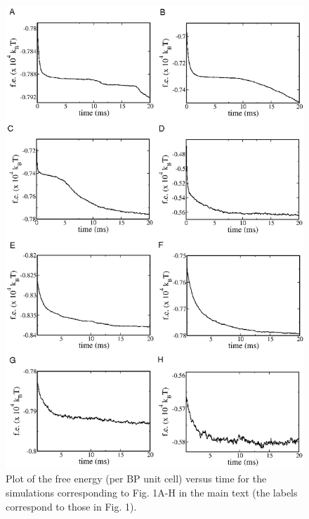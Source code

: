 \documentclass[12pt,twoside]{article}
\begin{document}
\begin{figure}[!h]
\begin{center}
\includegraphics[scale=0.49]{support-fig4.png}
\end{center}
\caption{Plot of the free energy (per BP unit cell) versus time
for the simulations corresponding to Fig. 1A-H in the main text
(the labels correspond to those in Fig. 1).
}
\end{figure}

\newpage
\end{document}
